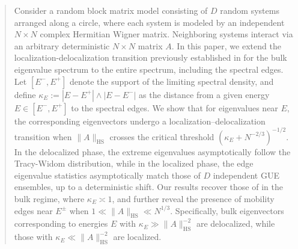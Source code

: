 \documentclass[10pt,reqno]{amsart}
\numberwithin{equation}{section}
\numberwithin{figure}{section}
\theoremstyle{plain} %
\theoremstyle{definition} %
\renewcommand{\txt}[1]{\text{\rm{#1}}}
\newcommand{\HS}{\txt{HS}}
\numberwithin{equation}{section}
\begin{document}
\begin{abstract}

Consider a random block matrix model consisting of $D$ random systems arranged along a circle, where each system is modeled by an independent $N\times N$ complex Hermitian Wigner matrix. Neighboring systems interact via an arbitrary deterministic $N\times N$ matrix $A$. 
In this paper, we extend the localization-delocalization transition previously established in \cite{stone2024randommatrixmodelquantum} for the bulk eigenvalue spectrum to the entire spectrum, including the spectral edges. Let $[E^-,E^+]$ denote the support of the limiting spectral density, and define $\kappa_E:=|E-E^+|\wedge |E-E^-|$ as the distance from a given energy $E \in [E^-, E^+]$ to the spectral edges. 
We show that for eigenvalues near $E$, the corresponding eigenvectors undergo a localization–delocalization transition when $\|A\|_{\mathrm{HS}}$ crosses the critical threshold $(\kappa_E + N^{-2/3})^{-1/2}$. In the delocalized phase, the extreme eigenvalues asymptotically follow the Tracy-Widom distribution, while in the localized phase, the edge eigenvalue statistics asymptotically match those of $D$ independent GUE ensembles, up to a deterministic shift.
Our results recover those of \cite{stone2024randommatrixmodelquantum} in the bulk regime, where $\kappa_E \asymp 1$, and further reveal the presence of mobility edges near $E^\pm$ when $1 \ll \|A\|_{\mathrm{HS}} \ll N^{1/3}$. Specifically, bulk eigenvectors corresponding to energies $E$ with $\kappa_E \gg \|A\|_{\mathrm{HS}}^{-2}$ are delocalized, while those with $\kappa_E \ll \|A\|_{\mathrm{HS}}^{-2}$ are localized.

\end{abstract}
\end{document}
